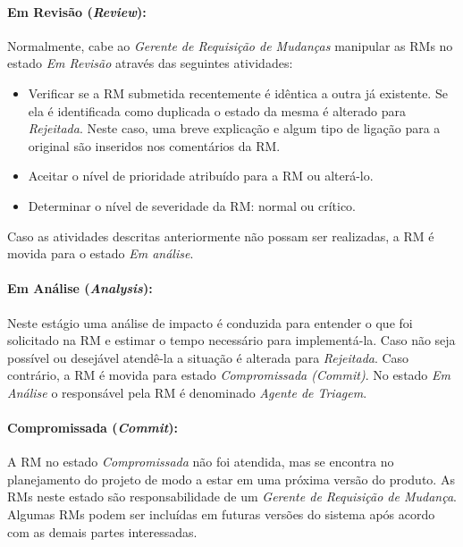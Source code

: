 \paragraph{Em Revisão (\textit{Review}):}\label{par:em_revisao}
Normalmente, cabe ao \textit{Gerente de Requisição de Mudanças} manipular as
RMs no estado \textit{Em Revisão} através das seguintes atividades:

\begin{itemize}
    \item Verificar se a RM submetida recentemente é idêntica a outra já
        existente. Se ela é identificada como duplicada o estado da mesma é
        alterado para \textit{Rejeitada}. Neste caso, uma breve explicação e
        algum tipo de ligação para a original são inseridos nos comentários da
        RM\@.
	\item Aceitar o nível de prioridade atribuído para a RM ou alterá-lo.
	\item Determinar o nível de severidade da RM\@: normal ou crítico.
\end{itemize}

Caso as atividades descritas anteriormente não possam ser re\-a\-li\-za\-das, a
RM é movida para o estado \textit{Em análise}.

\paragraph{Em Análise (\textit{Analysis}):}\label{par:em_analise}

Neste estágio uma análise de impacto é conduzida para entender o que foi
solicitado na RM e estimar o tempo necessário para implementá-la. Caso não seja
possível ou desejável atendê-la a situação é alterada para \textit{Rejeitada}.
Caso contrário, a RM é movida para estado \textit{Compromissada (Commit)}. No
estado \textit{Em Análise} o responsável pela RM é denominado \textit{Agente de
    Triagem}.

\paragraph{Compromissada (\textit{Commit}):}\label{par:commit}

A RM no estado \textit{Compromissada} não foi atendida, mas se encontra no
planejamento do projeto de modo a estar em uma próxima versão do produto. As RMs
neste estado são responsabilidade de um \textit{Gerente de Requisição de
    Mudança}. Algumas RMs podem ser incluídas em futuras versões do sistema após
acordo com as demais partes interessadas.


